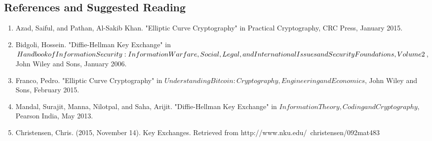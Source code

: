 \subsection{References and Suggested Reading} 
\begin{enumerate}[(1)]

\item
Azad, Saiful, and Pathan, Al-Sakib Khan. "Elliptic Curve Cryptography" in Practical Cryptography, CRC Press, January 2015.

\item
Bidgoli, Hossein. "Diffie-Hellman Key Exchange" in $Handbook of Information \newline Security: Information Warfare, Social, Legal, and International Issues and \newline Security Foundations, Volume 2$, John Wiley and Sons, January 2006.

\item
Franco, Pedro. "Elliptic Curve Cryptography" in $Understanding Bitcoin: Cryptography, Engineering and Economics$, John Wiley and Sons, February 2015.

\item 
Mandal, Surajit, Manna, Nilotpal, and Saha, Arijit. "Diffie-Hellman Key Exchange" in $Information Theory, Coding and Cryptography$, Pearson India, May 2013.

\item 
Christensen, Chris. (2015, November 14). Key Exchanges. Retrieved from http://www.nku.edu/~christensen/092mat483%



\end{enumerate}
